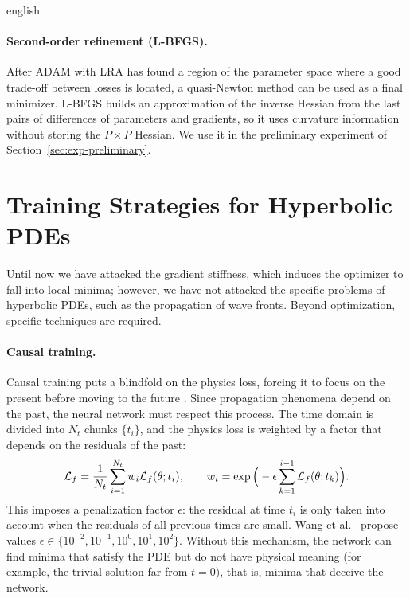 \documentclass[0000.tex]{subfiles}
\begin{document}
\begin{hyphenrules}{english}
\paragraph{Second-order refinement (L-BFGS).}
After ADAM with LRA has found a region of the parameter space where a good trade-off between losses is
located, a quasi-Newton method can be used as a final minimizer. L-BFGS builds an approximation of the
inverse Hessian from the last pairs of differences of parameters and gradients, so it uses curvature
information without storing the $P\times P$ Hessian. We use it in the preliminary experiment of Section~\ref{sec:exp-preliminary}.

\section{Training Strategies for Hyperbolic PDEs}\label{sec:training-strategies}

Until now we have attacked the gradient stiffness, which induces the optimizer to fall into local minima;
however, we have not attacked the specific problems of hyperbolic PDEs, such as the propagation of wave
fronts. Beyond optimization, specific techniques are required.

\paragraph{Causal training.}
Causal training puts a blindfold on the physics loss, forcing it to focus on the present before moving
to the future \cite{wang2024causality}. Since propagation phenomena depend on the past, the neural
network must respect this process. The time domain is divided into $N_t$ chunks $\{t_i\}$, and the
physics loss is weighted by a factor that depends on the residuals of the past:
\begin{equation}
  \mathcal{L}_f=\frac{1}{N_t}\sum_{i=1}^{N_t}w_i\mathcal{L}_f(\theta;t_i),\qquad
  w_i=\exp\Big(-\epsilon\sum_{k=1}^{i-1}\mathcal{L}_f(\theta;t_k)\Big).
  \label{eq:causal}
\end{equation}
This imposes a penalization factor $\epsilon$: the residual at time $t_i$ is only taken into account when
the residuals of all previous times are small. Wang et al.~\cite{wang2024causality} propose values
$\epsilon\in\{10^{-2},10^{-1},10^{0},10^{1},10^{2}\}$. Without this mechanism, the network can find
minima that satisfy the PDE but do not have physical meaning (for example, the trivial solution far from
$t=0$), that is, minima that deceive the network.


\end{hyphenrules}
\end{document}
